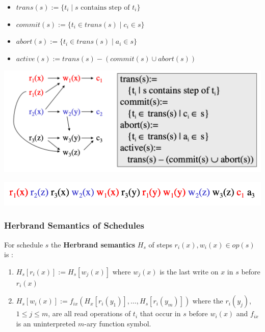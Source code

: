 \documentclass[11pt]{article}
\begin{document}
\begin{definition}[]
\begin{itemize}
\item \(trans(s):=\{t_i\mid s\text{ contains step of }t_i\}\)
\item \(commit(s):=\{t_i\in trans(s)\mid c_i\in s\}\)
\item \(abort(s):=\{t_i\in trans(s)\mid a_i\in s\}\)
\item \(active(s):=trans(s)-(commit(s)\cup abort(s))\)
\end{itemize}
\end{definition}


\begin{center}
\includegraphics[width=.8\textwidth]{../images/bigdatabase/6.png}
\label{}
\end{center}

\begin{center}
\includegraphics[width=.8\textwidth]{../images/bigdatabase/5.png}
\label{}
\end{center}
\subsubsection{Herbrand Semantics of Schedules}
\label{sec:org1e2d035}
\begin{definition}
For schedule \(s\) the \textbf{Herbrand semantics} \(H_s\) of steps \(r_i(x),w_i(x)\in op(s)\) is :
\begin{enumerate}
\item \(H_s[r_i(x)]:=H_s[w_j(x)]\) where \(w_j(x)\) is the last write on \(x\) in \(s\)
before \(r_i(x)\)
\item \(H_s[w_i(x)]:=f_{ix}(H_x[r_i(y_1)],\dots,H_s[r_i(y_m)])\) where
the \(r_i(y_j)\), \(1\le j\le m\), are all read operations of \(t_i\) that occur in \(s\)
before \(w_i(x)\) and \(f_{ix}\) is an uninterpreted \(m\)-ary function symbol.
\end{enumerate}
\end{definition}
\end{document}
